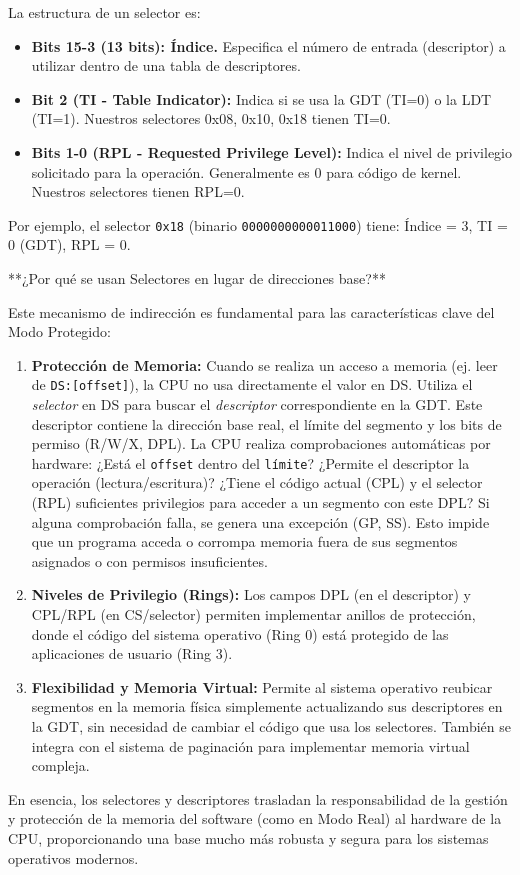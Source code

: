 La estructura de un selector es:
\begin{itemize}[noitemsep]
    \item \textbf{Bits 15-3 (13 bits): Índice.} Especifica el número de entrada (descriptor) a utilizar dentro de una tabla de descriptores.
    \item \textbf{Bit 2 (TI - Table Indicator):} Indica si se usa la GDT (TI=0) o la LDT (TI=1). Nuestros selectores 0x08, 0x10, 0x18 tienen TI=0.
    \item \textbf{Bits 1-0 (RPL - Requested Privilege Level):} Indica el nivel de privilegio solicitado para la operación. Generalmente es 0 para código de kernel. Nuestros selectores tienen RPL=0.
\end{itemize}
Por ejemplo, el selector \texttt{0x18} (binario \texttt{0000000000011000}) tiene: Índice = 3, TI = 0 (GDT), RPL = 0.

**¿Por qué se usan Selectores en lugar de direcciones base?**

Este mecanismo de indirección es fundamental para las características clave del Modo Protegido:
\begin{enumerate}
    \item \textbf{Protección de Memoria:} Cuando se realiza un acceso a memoria (ej. leer de \texttt{DS:[offset]}), la CPU no usa directamente el valor en DS. Utiliza el \textit{selector} en DS para buscar el \textit{descriptor} correspondiente en la GDT. Este descriptor contiene la dirección base real, el límite del segmento y los bits de permiso (R/W/X, DPL). La CPU realiza comprobaciones automáticas por hardware: ¿Está el \texttt{offset} dentro del \texttt{límite}? ¿Permite el descriptor la operación (lectura/escritura)? ¿Tiene el código actual (CPL) y el selector (RPL) suficientes privilegios para acceder a un segmento con este DPL? Si alguna comprobación falla, se genera una excepción (GP, SS). Esto impide que un programa acceda o corrompa memoria fuera de sus segmentos asignados o con permisos insuficientes.
    \item \textbf{Niveles de Privilegio (Rings):} Los campos DPL (en el descriptor) y CPL/RPL (en CS/selector) permiten implementar anillos de protección, donde el código del sistema operativo (Ring 0) está protegido de las aplicaciones de usuario (Ring 3).
    \item \textbf{Flexibilidad y Memoria Virtual:} Permite al sistema operativo reubicar segmentos en la memoria física simplemente actualizando sus descriptores en la GDT, sin necesidad de cambiar el código que usa los selectores. También se integra con el sistema de paginación para implementar memoria virtual compleja.
\end{enumerate}
En esencia, los selectores y descriptores trasladan la responsabilidad de la gestión y protección de la memoria del software (como en Modo Real) al hardware de la CPU, proporcionando una base mucho más robusta y segura para los sistemas operativos modernos.


